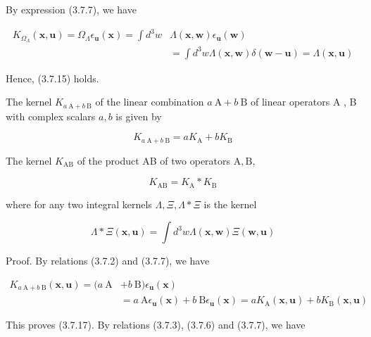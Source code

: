 \documentclass{article}
\begin{document}
By expression (3.7.7), we have
 
\begin{align*}
K_{\Omega_{\Lambda}}(\boldsymbol{x}, \boldsymbol{u})=\Omega_{\Lambda} \epsilon_{\boldsymbol{u}}(\boldsymbol{x})=\int d^{3} w & \Lambda(\boldsymbol{x}, \boldsymbol{w}) \epsilon_{\boldsymbol{u}}(\boldsymbol{w})  \tag{3.7.16}\\
& =\int d^{3} w \Lambda(\boldsymbol{x}, \boldsymbol{w}) \delta(\boldsymbol{w}-\boldsymbol{u})=\Lambda(\boldsymbol{x}, \boldsymbol{u})
\end{align*}
 

Hence, (3.7.15) holds.

The kernel $K_{a \mathrm{~A}+b \mathrm{~B}}$ of the linear combination $a \mathrm{~A}+b \mathrm{~B}$ of linear operators A , B with complex scalars $a, b$ is given by
 
\begin{equation*}
K_{a \mathrm{~A}+b \mathrm{~B}}=a K_{\mathrm{A}}+b K_{\mathrm{B}} \tag{3.7.17}
\end{equation*}
 

The kernel $K_{\mathrm{AB}}$ of the product AB of two operators $\mathrm{A}, \mathrm{B}$,
 
\begin{equation*}
K_{\mathrm{AB}}=K_{\mathrm{A}} * K_{\mathrm{B}} \tag{3.7.18}
\end{equation*}
 
where for any two integral kernels $\Lambda, \Xi, \Lambda * \Xi$ is the kernel
 
\begin{equation*}
\Lambda * \Xi(\boldsymbol{x}, \boldsymbol{u})=\int d^{3} w \Lambda(\boldsymbol{x}, \boldsymbol{w}) \Xi(\boldsymbol{w}, \boldsymbol{u}) \tag{3.7.19}
\end{equation*}
 

Proof. By relations (3.7.2) and (3.7.7), we have
 
\begin{align*}
K_{a \mathrm{~A}+b \mathrm{~B}}(\boldsymbol{x}, \boldsymbol{u})=(a \mathrm{~A} & +b \mathrm{~B}) \epsilon_{\boldsymbol{u}}(\boldsymbol{x}) \\
& =a \mathrm{~A} \epsilon_{\boldsymbol{u}}(\boldsymbol{x})+b \mathrm{~B} \epsilon_{\boldsymbol{u}}(\boldsymbol{x})=a K_{\mathrm{A}}(\boldsymbol{x}, \boldsymbol{u})+b K_{\mathrm{B}}(\boldsymbol{x}, \boldsymbol{u})
\end{align*}
 

This proves (3.7.17).
By relations (3.7.3), (3.7.6) and (3.7.7), we have
 
\end{document}
